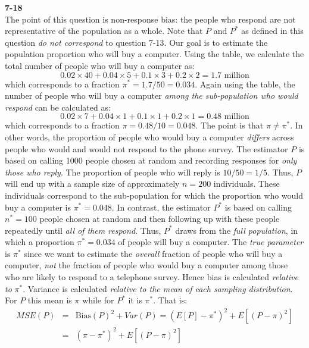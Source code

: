 \documentclass[addpoints,12pt]{exam}\usepackage[]{graphicx}\usepackage[]{color}
\begin{document}
\begin{questions}
\begin{solution}
    \end{solution}
  \item[]
    \begin{solution}
    \textbf{7-18}\\
    The point of this question is non-response bias: the people who respond are not representative of the population as a whole. Note that $P$ and $P^*$ as defined in this question \emph{do not correspond} to question 7-13. Our goal is to estimate the population proportion who will buy a computer. Using the table, we calculate the total number of people who will buy a computer as:
  $$0.02 \times 40 + 0.04\times 5 + 0.1\times 3 + 0.2\times 2 = 1.7 \mbox{ million}$$
which corresponds to a fraction $\pi^* = 1.7/50 = 0.034$. Again using the table, the number of people who will buy a computer \emph{among the sub-population who would respond} can be calculated as:
	$$0.02 \times 7 + 0.04\times 1 + 0.1\times 1 + 0.2\times 1 =  0.48 \mbox{ million}$$
which corresponds to a fraction $\pi = 0.48/10 = 0.048$. The point is that $\pi \neq \pi^*$. In other words, the proportion of people who would buy a computer \emph{differs} across people who would and would not respond to the phone survey. The estimator $P$ is based on calling 1000 people chosen at random and recording responses for \emph{only those who reply}. The proportion of people who will reply is $10/50 = 1/5$. Thus, $P$ will end up with a sample size of approximately $n=200$ individuals. These individuals correspond to the sub-population for which the proportion who would buy a computer is $\pi^* = 0.048$. In contrast, the estimator $P^*$ is based on calling $n^* = 100$ people chosen at random and then following up with these people repeatedly until \emph{all of them respond}. Thus, $P^*$ draws from the \emph{full population}, in which a proportion $\pi^* = 0.034$ of people will buy a computer. The \emph{true parameter} is $\pi^*$ since we want to estimate the \emph{overall} fraction of people who will buy a computer, \emph{not} the fraction of people who would buy a computer among those who are likely to respond to a telephone survey. Hence bias is calculated \emph{relative to} $\pi^*$. Variance is calculated \emph{relative to the mean of each sampling distribution}. For $P$ this mean is $\pi$ while for $P^*$ it is $\pi^*$. That is:
	\begin{eqnarray*}
		MSE(P) &=& \mbox{Bias}(P)^2 + Var(P) = (E[P] - \pi^*)^2 + E[(P - \pi)^2]\\
		&=& (\pi - \pi^*)^2 + E[(P - \pi)^2]\\

\end{eqnarray*}
\end{solution}
\end{questions}
\end{document}
